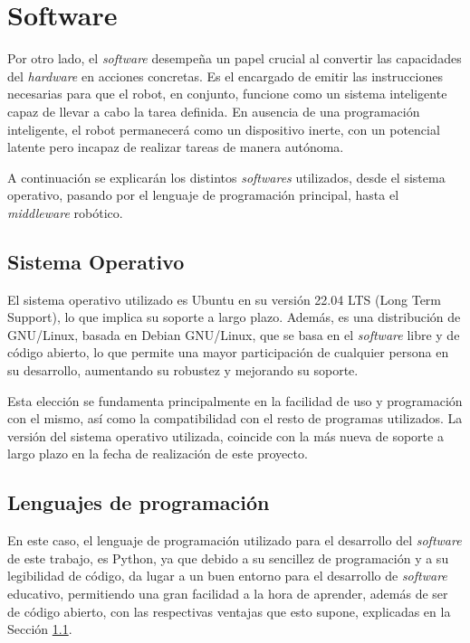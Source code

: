 \section{Software}
\label{sec:software}

Por otro lado, el \textit{software} desempeña un papel crucial al convertir las
capacidades del \textit{hardware} en acciones concretas.
Es el encargado de emitir las instrucciones necesarias para que el robot, en
conjunto, funcione como un sistema inteligente capaz de llevar a cabo la tarea
definida.
En ausencia de una programación inteligente, el robot permanecerá como un
dispositivo inerte, con un potencial latente pero incapaz de realizar tareas de
manera autónoma.

A continuación se explicarán los distintos \textit{softwares} utilizados, desde
el sistema operativo, pasando por el lenguaje de programación principal, hasta
el \textit{middleware} robótico.


\subsection{Sistema Operativo}
\label{sec:sistema_operativo}

El sistema operativo utilizado es Ubuntu en su versión 22.04 LTS (Long Term
Support), lo que implica su soporte a largo plazo.
Además, es una distribución de GNU/Linux, basada en Debian GNU/Linux, que se
basa en el \textit{software} libre y de código abierto, lo que permite una mayor
participación de cualquier persona en su desarrollo, aumentando su robustez y
mejorando su soporte.

Esta elección se fundamenta principalmente en la facilidad de uso y programación
con el mismo, así como la compatibilidad con el resto de programas utilizados.
La versión del sistema operativo utilizada, coincide con la más nueva de soporte
a largo plazo en la fecha de realización de este proyecto.


\subsection{Lenguajes de programación}
\label{sec:lenguaje_programacion}

En este caso, el lenguaje de programación utilizado para el desarrollo del
\textit{software} de este trabajo, es Python, ya que debido a su sencillez de
programación y a su legibilidad de código, da lugar a un buen entorno para el
desarrollo de \textit{software} educativo, permitiendo una gran facilidad a la
hora de aprender, además de ser de código abierto, con las respectivas ventajas
que esto supone, explicadas en la Sección \ref{sec:sistema_operativo}.

